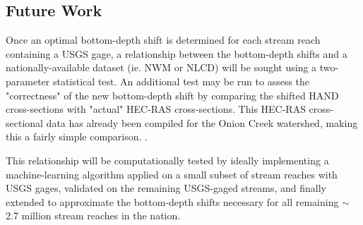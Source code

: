 \documentclass[11pt]{article}
\begin{document}
  \subsection*{Future Work} %

  Once an optimal bottom-depth shift is determined for each stream reach containing a USGS gage, a relationship between the bottom-depth shifts and a nationally-available dataset (ie. NWM or NLCD) will be sought using a two-parameter statistical test. An additional test may be run to assess the "correctness" of the new bottom-depth shift by comparing the shifted HAND cross-sections with "actual" HEC-RAS cross-sections. This HEC-RAS cross-sectional data has already been compiled for the Onion Creek watershed, making this a fairly simple comparison. \cite{xingms}. 

  This relationship will be computationally tested by ideally implementing a machine-learning algorithm applied on a small subset of stream reaches with USGS gages, validated on the remaining USGS-gaged streams, and finally extended to approximate the bottom-depth shifts necessary for all remaining $\sim$2.7 million stream reaches in the nation.

\printbibliography
\end{document}
